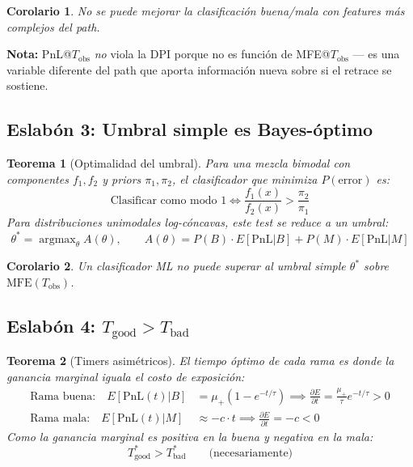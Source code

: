 \documentclass[11pt,a4paper]{article}
\newtheorem{theorem}{Teorema}
\newtheorem{corollary}{Corolario}
\begin{document}
\begin{corollary}
No se puede mejorar la clasificación buena/mala con features más complejos del path.
\end{corollary}
 
\textbf{Nota:} PnL@$T_{\text{obs}}$ \emph{no} viola la DPI porque no es función de MFE@$T_{\text{obs}}$ --- es una variable diferente del path que aporta información nueva sobre si el retrace se sostiene.
 
\subsection{Eslabón 3: Umbral simple es Bayes-óptimo}
 
\begin{theorem}[Optimalidad del umbral]
Para una mezcla bimodal con componentes $f_1, f_2$ y priors $\pi_1, \pi_2$, el clasificador que minimiza $P(\text{error})$ es:
\begin{equation}
\text{Clasificar como modo 1} \iff \frac{f_1(x)}{f_2(x)} > \frac{\pi_2}{\pi_1}
\end{equation}
Para distribuciones unimodales log-cóncavas, este test se reduce a un umbral:
\begin{equation}
\theta^* = \operatorname{argmax}_{\theta} A(\theta), \qquad A(\theta) = P(B)\cdot E[\text{PnL}|B] + P(M)\cdot E[\text{PnL}|M]
\end{equation}
\end{theorem}
 
\begin{corollary}
Un clasificador ML no puede superar al umbral simple $\theta^*$ sobre $\text{MFE}(T_{\text{obs}})$.
\end{corollary}
 
\subsection{Eslabón 4: $T_{\text{good}} > T_{\text{bad}}$}
 
\begin{theorem}[Timers asimétricos]
El tiempo óptimo de cada rama es donde la ganancia marginal iguala el costo de exposición:
\begin{align}
\text{Rama buena:} \quad E[\text{PnL}(t)|B] &= \mu_+(1 - e^{-t/\tau}) \implies \frac{\partial E}{\partial t} = \frac{\mu_+}{\tau} e^{-t/\tau} > 0 \\
\text{Rama mala:} \quad E[\text{PnL}(t)|M] &\approx -c \cdot t \implies \frac{\partial E}{\partial t} = -c < 0
\end{align}
Como la ganancia marginal es positiva en la buena y negativa en la mala:
\begin{equation}
T^*_{\text{good}} > T^*_{\text{bad}} \qquad \text{(necesariamente)}
\end{equation}
\end{theorem}
 
\end{document}
